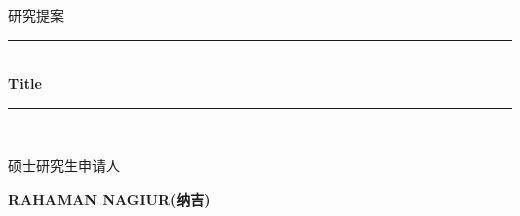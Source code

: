\documentclass[12pt]{article}
\newcommand{\HRule}{\rule{\linewidth}{1mm}}
\begin{document}
\begin{CJK*}{UTF8}{gbsn}

\begin{titlepage}
\begin{center}
    \vspace*{2cm}

    研究提案

    \HRule \\[0.3cm]
    { \large \bfseries Title}\\[0.1cm] 
    \HRule \\[0.3cm]


    \large{ \bfseries \begin{CJK*}{UTF8}{gbsn}硕士研究生申请人\end{CJK*}}
    \vspace*{7cm}
    

    \begin{CJK*}{UTF8}{gbsn}
        \Huge{ \bfseries RAHAMAN NAGIUR(纳吉)}
    \end{CJK*}

    
\end{center}
\end{titlepage}


\newpage

\onehalfspacing









   



\printbibliography
\end{CJK*}
\end{document}
